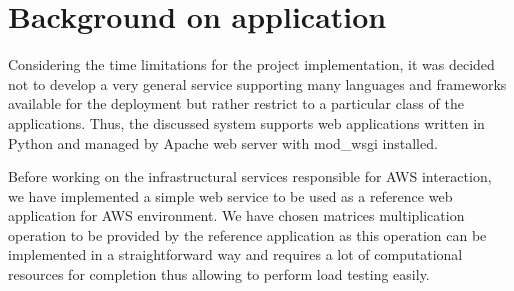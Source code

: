 \documentclass[conference]{IEEEtran}
\begin{document}
%


\section{Background on application}

Considering the time limitations for the project implementation, it was decided not to develop a very general service supporting many languages and frameworks available for the deployment but rather restrict to a particular class of the applications. Thus, the discussed system supports web applications written in Python and managed by Apache web server with mod\_wsgi installed.

Before working on the infrastructural services responsible for AWS interaction, we have implemented a simple web service to be used as a reference web application for AWS environment. We have chosen matrices multiplication operation to be provided by the reference application as this operation can be implemented in a straightforward way and requires a lot of computational resources for completion thus allowing to perform load testing easily.
\end{document}
